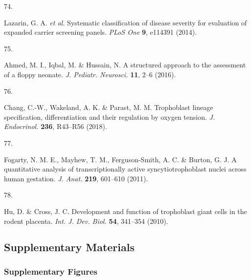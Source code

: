 \documentclass[
sn-nature
]{sn-jnl}
\newlength{\cslhangindent}
\newlength{\csllabelwidth}
\newenvironment{CSLReferences}[2] %
 {\begin{list}{}{%
  \setlength{\itemindent}{0pt}
  \setlength{\leftmargin}{0pt}
  \setlength{\parsep}{0pt}
  \ifodd #1
   \setlength{\leftmargin}{\cslhangindent}
   \setlength{\itemindent}{-1\cslhangindent}
  \fi
  \setlength{\itemsep}{#2\baselineskip}}}
 {\end{list}}
\newcommand{\CSLLeftMargin}[1]{\parbox[t]{\csllabelwidth}{\strut#1\strut}}
\newcommand{\CSLRightInline}[1]{\parbox[t]{\linewidth - \csllabelwidth}{\strut#1\strut}}
\begin{document}
\begin{CSLReferences}{0}{0}
\CSLLeftMargin{74. }%
\CSLRightInline{Lazarin, G. A. \emph{et al.} Systematic classification
of disease severity for evaluation of expanded carrier screening panels.
\emph{PLoS One} \textbf{9}, e114391 (2014).}

\CSLLeftMargin{75. }%
\CSLRightInline{Ahmed, M. I., Iqbal, M. \& Hussain, N. A structured
approach to the assessment of a floppy neonate. \emph{J. Pediatr.
Neurosci.} \textbf{11}, 2--6 (2016).}

\CSLLeftMargin{76. }%
\CSLRightInline{Chang, C.-W., Wakeland, A. K. \& Parast, M. M.
Trophoblast lineage specification, differentiation and their regulation
by oxygen tension. \emph{J. Endocrinol.} \textbf{236}, R43--R56 (2018).}

\CSLLeftMargin{77. }%
\CSLRightInline{Fogarty, N. M. E., Mayhew, T. M., Ferguson-Smith, A. C.
\& Burton, G. J. A quantitative analysis of transcriptionally active
syncytiotrophoblast nuclei across human gestation. \emph{J. Anat.}
\textbf{219}, 601--610 (2011).}

\CSLLeftMargin{78. }%
\CSLRightInline{Hu, D. \& Cross, J. C. Development and function of
trophoblast giant cells in the rodent placenta. \emph{Int. J. Dev.
Biol.} \textbf{54}, 341--354 (2010).}

\end{CSLReferences}

\hfill\break

\newpage{}

\subsection{Supplementary Materials}\label{supplementary-materials}

\subsubsection{Supplementary Figures}\label{supplementary-figures}
\end{document}
